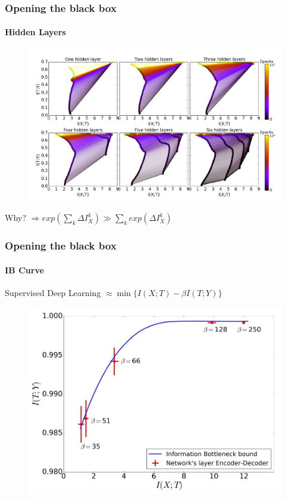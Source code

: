 \documentclass[10pt]{beamer}
\begin{document}
\begin{frame}
\frametitle{Opening the black box}
\framesubtitle{Hidden Layers}
\vspace*{-1.5mm}
\begin{figure}
\centering
\includegraphics[scale=0.23]{figs/hidden-layers.jpeg}
\end{figure}
\begin{center}
Why? $ \Rightarrow \boxed{exp(\sum_k \Delta I_X^k) \gg \sum_k exp(\Delta I_X^k)} $
\end{center}
\end{frame}

\begin{frame}
\frametitle{Opening the black box}
\framesubtitle{IB Curve}
\begin{center}
Supervised Deep Learning $\approx \min \{I(X;T) - \beta I(T;Y)\} $
\end{center}
\begin{figure}
\centering
\includegraphics[scale=0.23]{figs/ib-curve.jpeg}
\end{figure}
\end{frame}
\end{document}
